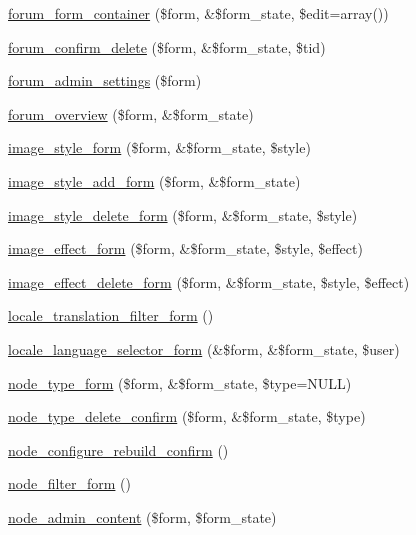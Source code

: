 \begin{DoxyCompactItemize}
\item 
\hyperlink{group__forms_gaaf28a1fc0cf33c8cc9f8ffd08fad202c}{forum\_\-form\_\-container} (\$form, \&\$form\_\-state, \$edit=array())
\item 
\hyperlink{group__forms_ga2e160e8a91338ff16883e27d806eb63e}{forum\_\-confirm\_\-delete} (\$form, \&\$form\_\-state, \$tid)
\item 
\hyperlink{group__forms_ga1e08f493fe043879a93e783b05cfb870}{forum\_\-admin\_\-settings} (\$form)
\item 
\hyperlink{group__forms_ga889bd81421fcd1aa02d5fc45c5ff8256}{forum\_\-overview} (\$form, \&\$form\_\-state)
\item 
\hyperlink{group__forms_ga4e39fcf28fa02c59163663ed6fca7d66}{image\_\-style\_\-form} (\$form, \&\$form\_\-state, \$style)
\item 
\hyperlink{group__forms_gaee4ef5746d1f8f6e3dda5fae710d4d8d}{image\_\-style\_\-add\_\-form} (\$form, \&\$form\_\-state)
\item 
\hyperlink{group__forms_gae419759130d231f0fa8cc6ef293c2b12}{image\_\-style\_\-delete\_\-form} (\$form, \&\$form\_\-state, \$style)
\item 
\hyperlink{group__forms_ga0e5c2f6d235007423202fcae209b311b}{image\_\-effect\_\-form} (\$form, \&\$form\_\-state, \$style, \$effect)
\item 
\hyperlink{group__forms_ga25884137c6384012e7a7d6cdde5d8afa}{image\_\-effect\_\-delete\_\-form} (\$form, \&\$form\_\-state, \$style, \$effect)
\item 
\hyperlink{group__forms_gac2e3730d5cd788d059298b3ada8f5a9b}{locale\_\-translation\_\-filter\_\-form} ()
\item 
\hyperlink{group__forms_gaa40610c0086c0fadbca6db8b42d83236}{locale\_\-language\_\-selector\_\-form} (\&\$form, \&\$form\_\-state, \$user)
\item 
\hyperlink{group__forms_ga488f2cb519f924aa0bd9579d9bb0db49}{node\_\-type\_\-form} (\$form, \&\$form\_\-state, \$type=NULL)
\item 
\hyperlink{group__forms_ga1ecf3ba8b8cb5469096a74f3e4f18546}{node\_\-type\_\-delete\_\-confirm} (\$form, \&\$form\_\-state, \$type)
\item 
\hyperlink{group__forms_ga650b907eb478b9c293e4b93e3ecb560d}{node\_\-configure\_\-rebuild\_\-confirm} ()
\item 
\hyperlink{group__forms_ga2b7edb82b488db11ffde4fa60958004d}{node\_\-filter\_\-form} ()
\item 
\hyperlink{group__forms_ga9e864b6f961a37906f23989987913091}{node\_\-admin\_\-content} (\$form, \$form\_\-state)

\end{DoxyCompactItemize}
